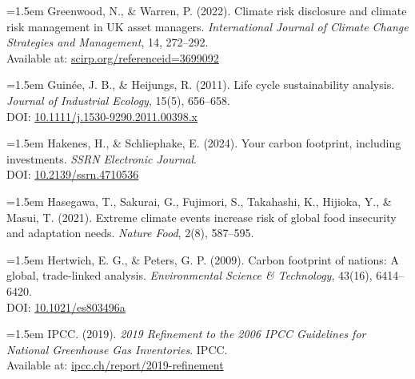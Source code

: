 \documentclass[12pt,a4paper]{article}%
\begin{document}
\vspace{0.5em}
{\small
\noindent
\parbox{\linewidth}{
\hangindent=1.5em
Greenwood, N., \& Warren, P. (2022). Climate risk disclosure and climate risk management in UK asset managers. \textit{International Journal of Climate Change Strategies and Management}, 14, 272–292. \\
Available at: \href{https://www.scirp.org/reference/referencespapers?referenceid=3699092}{scirp.org/referenceid=3699092}
}
}

\vspace{0.5em}
{\small
\noindent
\parbox{\linewidth}{
\hangindent=1.5em
Guinée, J. B., \& Heijungs, R. (2011). Life cycle sustainability analysis. \textit{Journal of Industrial Ecology}, 15(5), 656–658. \\
DOI: \href{https://doi.org/10.1111/j.1530-9290.2011.00398.x}{10.1111/j.1530-9290.2011.00398.x}
}
}

\vspace{0.5em}
{\small
\noindent
\parbox{\linewidth}{
\hangindent=1.5em
Hakenes, H., \& Schliephake, E. (2024). Your carbon footprint, including investments. \textit{SSRN Electronic Journal}. \\
DOI: \href{https://doi.org/10.2139/ssrn.4710536}{10.2139/ssrn.4710536}
}
}

\vspace{0.5em}
{\small
\noindent
\parbox{\linewidth}{
\hangindent=1.5em
Hasegawa, T., Sakurai, G., Fujimori, S., Takahashi, K., Hijioka, Y., \& Masui, T. (2021). Extreme climate events increase risk of global food insecurity and adaptation needs. \textit{Nature Food}, 2(8), 587–595.
}
}
\vspace{0.5em}
{\small
\noindent
\parbox{\linewidth}{
\hangindent=1.5em
Hertwich, E. G., \& Peters, G. P. (2009). Carbon footprint of nations: A global, trade-linked analysis. \textit{Environmental Science \& Technology}, 43(16), 6414–6420. \\
DOI: \href{https://doi.org/10.1021/es803496a}{10.1021/es803496a}
}
}

\vspace{0.5em}
{\small
\noindent
\parbox{\linewidth}{
\hangindent=1.5em
IPCC. (2019). \textit{2019 Refinement to the 2006 IPCC Guidelines for National Greenhouse Gas Inventories}. IPCC. \\
Available at: \href{https://www.ipcc.ch/report/2019-refinement-to-the-2006-ipcc-guidelines-for-national-greenhouse-gas-inventories/}{ipcc.ch/report/2019-refinement}
}
}
\end{document}
